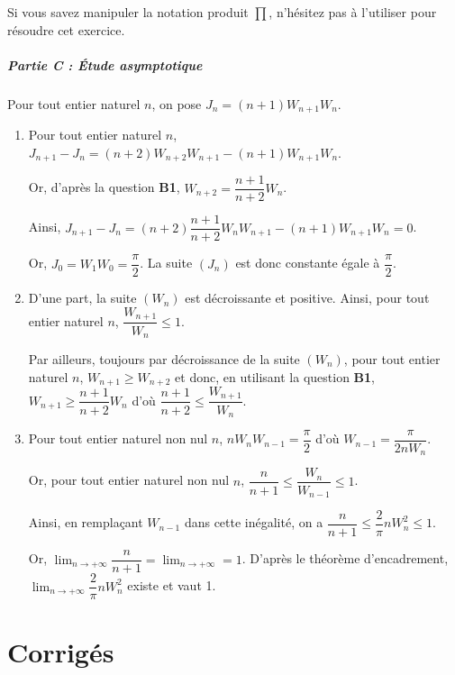 \documentclass[11pt,fleqn, openany]{book} %
\begin{document}
\begin{solution}
\begin{enumerate}
Si vous savez manipuler la notation produit $\prod$, n'hésitez pas à l'utiliser pour résoudre cet exercice.

\end{enumerate}

\paragraph{Partie C : Étude asymptotique}

Pour tout entier naturel $n$, on pose $J_n=(n+1)W_{n+1}W_n$.
\begin{enumerate}
\item Pour tout entier naturel $n$, $J_{n+1}-J_n = (n+2)W_{n+2}W_{n+1}-(n+1)W_{n+1}W_n$. 

Or, d'après la question \textbf{B1}, $W_{n+2}=\dfrac{n+1}{n+2}W_n$. 

Ainsi, $J_{n+1}-J_n = (n+2)\dfrac{n+1}{n+2}W_nW_{n+1}-(n+1)W_{n+1}W_n=0$.

Or, $J_0=W_1W_0=\dfrac{\pi}{2}$. La suite $(J_n)$ est donc constante égale à $\dfrac{\pi}{2}$.

\item D'une part, la suite $(W_n)$ est décroissante et positive. Ainsi, pour tout entier naturel $n$, $\dfrac{W_{n+1}}{W_n} \leqslant 1$. 

Par ailleurs, toujours par décroissance de la suite $(W_n)$, pour tout entier naturel $n$, $W_{n+1} \geqslant W_{n+2}$ et donc, en utilisant la question \textbf{B1},  $W_{n+1} \geqslant \dfrac{n+1}{n+2}W_n$ d'où $\dfrac{n+1}{n+2} \leqslant \dfrac{W_{n+1}}{W_n}$.

\item Pour tout entier naturel non nul $n$, $nW_nW_{n-1}=\dfrac{\pi}{2}$ d'où $W_{n-1}=\dfrac{\pi}{2nW_n}$. 

Or, pour tout entier naturel non nul $n$, $\dfrac{n}{n+1} \leqslant \dfrac{W_n}{W_{n-1}} \leqslant 1$.

 Ainsi, en remplaçant $W_{n-1}$ dans cette inégalité, on a $\dfrac{n}{n+1} \leqslant   \dfrac{2}{\pi}n W_n^2 \leqslant 1$.

Or, $\displaystyle\lim_{n\to+\infty}\dfrac{n}{n+1}=\displaystyle\lim_{n\to+\infty}=1$. D'après le théorème d'encadrement, $\displaystyle\lim_{n \to + \infty} \dfrac{2}{\pi}n W_n^2$ existe et vaut 1.
\end{enumerate}
\end{solution}


\chapter{Corrigés}
\end{document}
